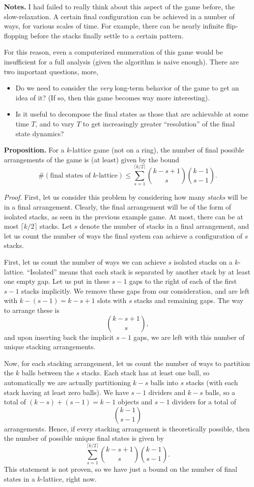 \documentclass[10pt]{article}        	%
\begin{document}
\bigskip
\noindent \textbf{Notes.} I had failed to really think about this aspect of the game before, the slow-relaxation. A certain final configuration can be achieved in a number of ways, for various scales of time. For example, there can be nearly infinite flip-flopping before the stacks finally settle to a certain pattern.

For this reason, even a computerized enumeration of this game would be insufficient for a full analysis (given the algorithm is naive enough). There are two important questions, more,

\begin{itemize}
	\item Do we need to consider the \textit{very} long-term behavior of the game to get an idea of it? (If so, then this game becomes way more interesting).
	\item Is it useful to decompose the final states as those that are achievable at some time $T$, and to vary $T$ to get increasingly greater ``resolution'' of the final state dynamics?
\end{itemize}

\bigskip
\noindent \textbf{Proposition.} For a $k$-lattice game (not on a ring), the number of final possible arrangements of the game is (at least) given by the bound $$\#(\text{final states of }k\text{-lattice})\leq \sum_{s=1}^{\lceil k/2\rceil}{k-s+1\choose s}{k-1\choose s-1}.$$

\bigskip
\noindent \textit{Proof.} First, let us consider this problem by considering how many \textit{stacks} will be in a final arrangement. Clearly, the final arrangement will be of the form of isolated stacks, as seen in the previous example game. At most, there can be at most $\lceil k/2\rceil$ stacks. Let $s$ denote the number of stacks in a final arrangement, and let us count the number of ways the final system can achieve a configuration of $s$ stacks.

First, let us count the number of ways we can achieve $s$ isolated stacks on a $k$-lattice. ``Isolated'' means that each stack is separated by another stack by at least one empty gap. Let us put in these $s-1$ gaps to the right of each of the first $s-1$ stacks implicitly. We remove these gaps from our consideration, and are left with $k-(s-1)=k-s+1$ slots with $s$ stacks and remaining gaps. The way to arrange these is $${k-s+1\choose s},$$ and upon inserting back the implicit $s-1$ gaps, we are left with this number of unique stacking arrangements.

Now, for each stacking arrangement, let us count the number of ways to partition the $k$ balls between the $s$ stacks. Each stack has at least one ball, so automatically we are actually partitioning $k-s$ balls into $s$ stacks (with each stack having at least zero balls). We have $s-1$ dividers and $k-s$ balls, so a total of $(k-s)+(s-1)=k-1$ objects and $s-1$ dividers for a total of $${k-1\choose s-1}$$ arrangements. Hence, if every stacking arrangement is theoretically possible, then the number of possible unique final states is given by $$\sum_{s=1}^{\lceil k/2\rceil} {k-s+1\choose s}{k-1\choose s-1}.$$ This statement is not proven, so we have just a bound on the number of final states in a $k$-lattice, right now.
\end{document}
